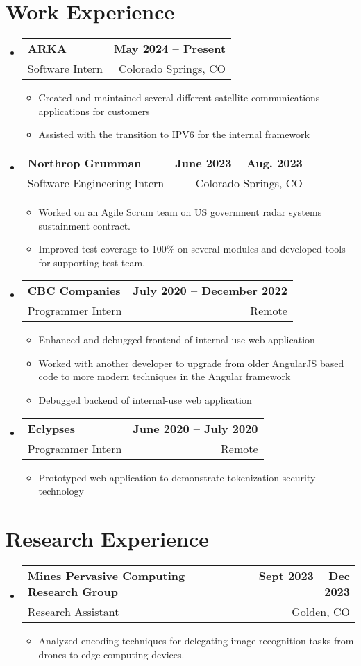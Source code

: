 \documentclass[11pt, letterpaper]{article}
\makeatletter
\newcommand{\resumeItem}[1]{
  \item\small{
    {#1 \vspace{-2pt}}
  }
}
\newcommand{\resumeSubheading}[4]{
  \vspace{-2pt}\item
    \begin{tabular*}{1.0\textwidth}[t]{l@{\extracolsep{\fill}}r}
      \textbf{#1} & \textbf{\small #2} \\
      {\small#3} & {\small #4} \\
    \end{tabular*}\vspace{-7pt}
}
\newcommand{\resumeSubHeadingListStart}{\begin{itemize}[leftmargin=0.0in, label={}]}
\newcommand{\resumeSubHeadingListEnd}{\end{itemize}}
\newcommand{\resumeItemListStart}{\begin{itemize}}
\newcommand{\resumeItemListEnd}{\end{itemize}\vspace{-5pt}}
\makeatother
\begin{document}
\section{Work Experience}   %
  \resumeSubHeadingListStart
    \resumeSubheading
        {ARKA}{May 2024 -- Present}
        {Software Intern}{Colorado Springs, CO}
        \resumeItemListStart
            \resumeItem{Created and maintained several different satellite communications applications for customers}
            \resumeItem{Assisted with the transition to IPV6 for the internal framework}
            \resumeItemListEnd
    \resumeSubheading
      {Northrop Grumman}{June 2023 -- Aug. 2023}
      {Software Engineering Intern}{Colorado Springs, CO}
      \resumeItemListStart
        \resumeItem{Worked on an Agile Scrum team on US government radar systems sustainment contract.}
        \resumeItem{Improved test coverage to 100\% on several modules and developed tools for supporting test team.}
        \resumeItemListEnd

    \resumeSubheading
        {CBC Companies }{July 2020 -- December 2022}
        {Programmer Intern}    {Remote}                            \resumeItemListStart           
            \resumeItem{Enhanced and debugged frontend of internal-use web application}
            \resumeItem{Worked with another developer to upgrade from older AngularJS based code to more modern techniques in the Angular framework}
            \resumeItem{Debugged backend of internal-use web application}
        \resumeItemListEnd

    \resumeSubheading
        {Eclypses}{June 2020 -- July 2020}
        {Programmer Intern}{Remote}
        \resumeItemListStart
            \resumeItem{Prototyped web application to demonstrate tokenization security technology}
        \resumeItemListEnd
    
  \resumeSubHeadingListEnd

\section{Research Experience}
  \resumeSubHeadingListStart
    \resumeSubheading
      {Mines Pervasive Computing Research Group}{Sept 2023 -- Dec 2023}
      {Research Assistant}{Golden, CO}
      \resumeItemListStart
        \resumeItem{Analyzed encoding techniques for delegating image recognition tasks from drones to edge computing devices.}
    \resumeItemListEnd
  \resumeSubHeadingListEnd
\end{document}
